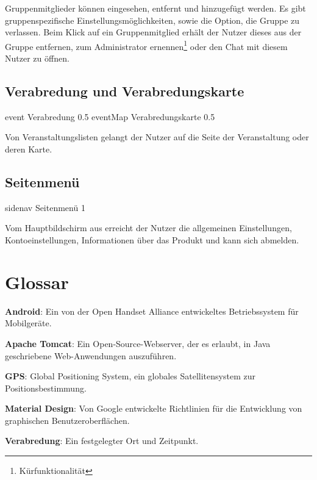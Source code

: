 \documentclass[parskip=full,11pt]{scrartcl}
\begin{document}
Gruppenmitglieder können eingesehen, entfernt und hinzugefügt werden.
Es gibt gruppenspezifische Einstellungsmöglichkeiten, sowie die Option,
die Gruppe zu verlassen.
Beim Klick auf ein Gruppenmitglied erhält der Nutzer dieses aus der
Gruppe entfernen, zum Administrator ernennen\footnote[1]{Kürfunktionalität}
oder den Chat mit diesem Nutzer zu öffnen\footnotemark[1].

\pagebreak
\subsection{Verabredung  und Verabredungskarte}
{event}
{Verabredung}
{0.5}
{eventMap}
{Verabredungskarte}
{0.5}

Von Veranstaltungslisten gelangt der Nutzer auf die Seite der Veranstaltung oder deren Karte.

\pagebreak
\subsection{Seitenmenü}
{sidenav}
{Seitenmenü}
{1}

Vom Hauptbildschirm aus erreicht der Nutzer die allgemeinen Einstellungen, Kontoeinstellungen, Informationen über das Produkt und kann sich abmelden.

\pagebreak
\section{Glossar}

\textbf{Android}:
Ein von der Open Handset Alliance entwickeltes Betriebssystem für Mobilgeräte.

\textbf{Apache Tomcat}:
Ein Open-Source-Webserver, der es erlaubt, in Java geschriebene Web-Anwendungen
auszuführen.

\textbf{GPS}:
Global Positioning System, ein globales Satellitensystem zur
Positionsbestimmung.

\textbf{Material Design}:
Von Google entwickelte Richtlinien für die Entwicklung von graphischen
Benutzeroberflächen.

\textbf{Verabredung}:
Ein festgelegter Ort und Zeitpunkt.
\end{document}
